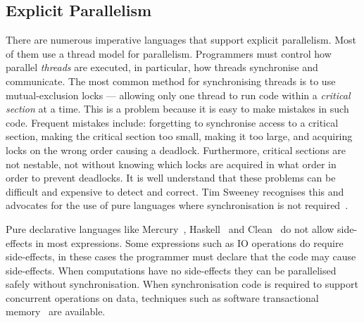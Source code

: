 



\subsection{Explicit Parallelism}
\label{sec:lit_explicit-parallelism}

There are numerous imperative languages that support explicit
parallelism.
Most of them use a thread model for parallelism.
Programmers must control how parallel \emph{threads} are executed,
in particular, how threads synchronise and communicate.
The most common method for synchronising threads is to use
mutual-exclusion locks --- allowing only one thread to run code within
a \emph{critical section} at a time.
This is a problem because it is easy to make mistakes in such code.
Frequent mistakes include: forgetting to synchronise access to a critical
section, making the critical section too small, making it
too large, and acquiring locks on the wrong order causing a deadlock.
Furthermore, critical sections are not nestable, not without
knowing which locks are acquired in what order in order to prevent
deadlocks.
It is well understand that these problems can be difficult and
expensive to detect and correct.
Tim Sweeney recognises this and advocates for the use of pure
languages where synchronisation is not
required~\cite{sweeney:2009:end_gpu_roadmap}.


Pure declarative languages like Mercury~\cite{mercury-jlp},
Haskell~\cite{haskell98} and Clean~\cite{1991:concurrent-clean} do not
allow side-effects in most expressions.
Some expressions such as IO operations do require side-effects, in
these cases the programmer must declare that the code may cause
side-effects.
When computations have no side-effects they can be parallelised safely
without synchronisation.
When synchronisation code is required to support concurrent operations
on data, techniques such as software transactional
memory~\cite{harris_marlow_spj:haskell-stm, mika:mercury-stm} are
available.

